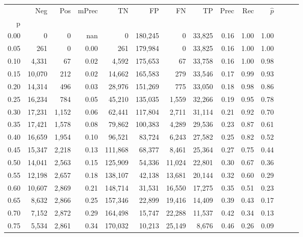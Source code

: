 \begin{tabular}{rrrrrrrrrrrrrr}
\toprule
{} &     Neg &    Pos & mPrec &       TN &       FP &      FN &      TP &  Prec &   Rec & $\hat{p}$ \\
p    &         &        &       &          &          &         &         &       &       &           \\
\midrule
0.00 &       0 &      0 &   nan &        0 &  180,245 &       0 &  33,825 &  0.16 &  1.00 &      1.00 \\
0.05 &     261 &      0 &  0.00 &      261 &  179,984 &       0 &  33,825 &  0.16 &  1.00 &      1.00 \\
0.10 &   4,331 &     67 &  0.02 &    4,592 &  175,653 &      67 &  33,758 &  0.16 &  1.00 &      0.98 \\
0.15 &  10,070 &    212 &  0.02 &   14,662 &  165,583 &     279 &  33,546 &  0.17 &  0.99 &      0.93 \\
0.20 &  14,314 &    496 &  0.03 &   28,976 &  151,269 &     775 &  33,050 &  0.18 &  0.98 &      0.86 \\
0.25 &  16,234 &    784 &  0.05 &   45,210 &  135,035 &   1,559 &  32,266 &  0.19 &  0.95 &      0.78 \\
0.30 &  17,231 &  1,152 &  0.06 &   62,441 &  117,804 &   2,711 &  31,114 &  0.21 &  0.92 &      0.70 \\
0.35 &  17,421 &  1,578 &  0.08 &   79,862 &  100,383 &   4,289 &  29,536 &  0.23 &  0.87 &      0.61 \\
0.40 &  16,659 &  1,954 &  0.10 &   96,521 &   83,724 &   6,243 &  27,582 &  0.25 &  0.82 &      0.52 \\
0.45 &  15,347 &  2,218 &  0.13 &  111,868 &   68,377 &   8,461 &  25,364 &  0.27 &  0.75 &      0.44 \\
0.50 &  14,041 &  2,563 &  0.15 &  125,909 &   54,336 &  11,024 &  22,801 &  0.30 &  0.67 &      0.36 \\
0.55 &  12,198 &  2,657 &  0.18 &  138,107 &   42,138 &  13,681 &  20,144 &  0.32 &  0.60 &      0.29 \\
0.60 &  10,607 &  2,869 &  0.21 &  148,714 &   31,531 &  16,550 &  17,275 &  0.35 &  0.51 &      0.23 \\
0.65 &   8,632 &  2,866 &  0.25 &  157,346 &   22,899 &  19,416 &  14,409 &  0.39 &  0.43 &      0.17 \\
0.70 &   7,152 &  2,872 &  0.29 &  164,498 &   15,747 &  22,288 &  11,537 &  0.42 &  0.34 &      0.13 \\
0.75 &   5,534 &  2,861 &  0.34 &  170,032 &   10,213 &  25,149 &   8,676 &  0.46 &  0.26 &      0.09 \\

\end{tabular}
